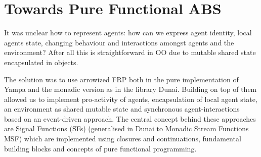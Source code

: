 \section{Towards Pure Functional ABS}
It was unclear how to represent agents: how can we express agent identity, local agents state, changing behaviour and interactions amongst agents and the environment? After all this is straightforward in OO due to mutable shared state encapsulated in objects.

The solution was to use arrowized FRP both in the pure implementation of Yampa and the monadic version as in the library Dunai. Building on top of them allowed us to implement pro-activity of agents, encapsulation of local agent state, an environment as shared mutable state and synchronous agent-interactions based on an event-driven approach. The central concept behind these approaches are Signal Functions (SFs) (generalised in Dunai to Monadic Stream Functions MSF) which are implemented using closures and continuations, fundamental building blocks and concepts of pure functional programming. 







